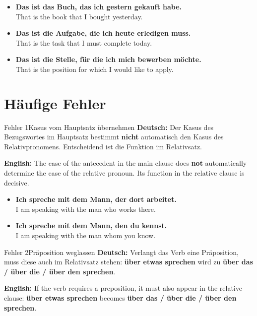 \documentclass[a4paper,11pt]{article}
\newcommand{\GermanText}[1]{\textbf{Deutsch: }#1\par}
\newcommand{\EnglishText}[1]{{\small\color{SoftGray}\textbf{English: }#1\par}}
\newcommand{\ExampleItem}[2]{\item \textbf{#1}\\{\small\color{SoftGray}#2}}
\begin{document}
        \begin{exbox}
            \begin{itemize}
                \ExampleItem{Das ist das Buch, das ich gestern gekauft habe.}{That is the book that I bought yesterday.}
                \ExampleItem{Das ist die Aufgabe, die ich heute erledigen muss.}{That is the task that I must complete today.}
                \ExampleItem{Das ist die Stelle, für die ich mich bewerben möchte.}{That is the position for which I would like to apply.}
            \end{itemize}
        \end{exbox}

    \section{Häufige Fehler}

        \begin{grammarentry}{Fehler 1}{Kasus vom Hauptsatz übernehmen}
            \GermanText{Der Kasus des Bezugswortes im Hauptsatz bestimmt \textbf{nicht} automatisch den Kasus des Relativpronomens. Entscheidend ist die Funktion im Relativsatz.}
            \EnglishText{The case of the antecedent in the main clause does \textbf{not} automatically determine the case of the relative pronoun. Its function in the relative clause is decisive.}
        \end{grammarentry}

        \begin{exbox}
            \begin{itemize}
                \ExampleItem{Ich spreche mit dem Mann, der dort arbeitet.}{I am speaking with the man who works there.}
                \ExampleItem{Ich spreche mit dem Mann, den du kennst.}{I am speaking with the man whom you know.}
            \end{itemize}
        \end{exbox}

        \begin{grammarentry}{Fehler 2}{Präposition weglassen}
            \GermanText{Verlangt das Verb eine Präposition, muss diese auch im Relativsatz stehen: \textbf{über etwas sprechen} wird zu \textbf{über das / über die / über den sprechen}.}
            \EnglishText{If the verb requires a preposition, it must also appear in the relative clause: \textbf{über etwas sprechen} becomes \textbf{über das / über die / über den sprechen}.}
        \end{grammarentry}
\end{document}
